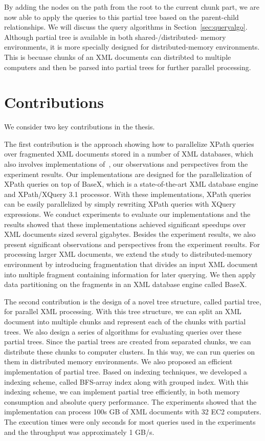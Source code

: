 By adding the nodes on the path from the root to the current chunk part, we are
now able to apply the queries to this partial tree based on the parent-child
relationships. We will discuss the query algorithms in
Section~\ref{sec:queryalgo}. Although partial tree is available in both
shared-/distributed- memory environments, it is more specially designed for
distributed-memory environments. This is becuase chunks of an XML documents can
distribted to multiple computers and then be parsed into partial trees for
further parallel processing.

\section{Contributions}

We consider two key contributions in the thesis.

The first contribution is the approach showing how to parallelize XPath queries
over fragmented XML documents stored in a number of XML databases, which also
involves implementations of~\cite{BoLS09}, our observations and perspectives
from the experiment results. Our implementations are designed for the
parallelization of XPath queries on top of BaseX, which is a state-of-the-art
XML database engine and XPath/XQuery 3.1 processor. With these implementations,
XPath queries can be easily parallelized by simply rewriting XPath queries with
XQuery expressions. We conduct experiments to evaluate our implementations and
the results showed that these implementations achieved significant speedups over
XML documents sized several gigabytes. Besides the experiment results, we also
present significant observations and perspectives from the experiment results.
For processing larger XML documents, we extend the study to distributed-memory
environment by introducing fragmentation that divides an input XML document 
into multiple fragment containing information for later querying. We then apply
data partitioning on the fragments in an XML database engine called BaseX. 

The second contribution is the design of a novel tree structure, called partial
tree, for parallel XML processing. With this tree structure, we can split an XML
document into multiple chunks and represent each of the chunks with partial
trees. We also design a series of algorithms for evaluating queries over these
partial trees. Since the partial trees are created from separated chunks, we can
distribute these chunks to computer clusters. In this way, we can run queries on
them in distributed memory environments. We also proposed an efficient
implementation of partial tree. Based on indexing techniques, we developed a
indexing scheme, called BFS-array index along with grouped index. With this
indexing scheme, we can implement partial tree efficiently, in both memory
consumption and absolute query performance. The experiments showed that the
implementation can process 100s GB of XML documents with 32 EC2 computers. The
execution times were only seconds for most queries used in the experiments and
the throughput was approximately 1 GB/s.

